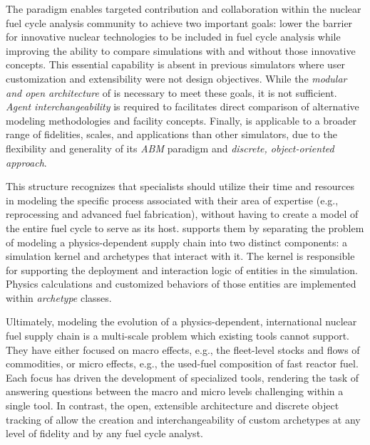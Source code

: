 The \Cyclus paradigm enables targeted contribution and collaboration within the
nuclear fuel cycle analysis community to achieve two important goals: lower the
barrier for innovative nuclear technologies to be included in fuel cycle analysis
while improving the ability to compare simulations with and without those innovative
concepts.  This essential capability is absent in
previous simulators where user customization and extensibility were not design
objectives.  While the \emph{modular and open architecture} of
\Cyclus is necessary to meet these goals, it is not sufficient.
\emph{Agent interchangeability} is required to facilitates direct comparison
of alternative modeling methodologies and facility concepts.  Finally, \Cyclus is
applicable to a broader range of fidelities, scales, and applications than
other simulators, due to the flexibility and generality of its
\emph{\gls{ABM}} paradigm and \emph{discrete, object-oriented approach}.

This structure recognizes that specialists should utilize their time and
resources in modeling the specific process associated with their area of
expertise (e.g., reprocessing and advanced fuel fabrication), without having to
create a model of the entire fuel cycle to serve as its host.  \Cyclus supports
them by separating the problem of modeling a physics-dependent supply chain into
two distinct components: a simulation kernel and archetypes that interact with
it. The kernel is responsible for supporting the deployment and
interaction logic of entities in the simulation.  Physics calculations and
customized behaviors of those entities are implemented within \emph{archetype}
classes.

Ultimately, modeling the evolution of a physics-dependent, international
nuclear fuel supply chain is a multi-scale problem which existing tools cannot
support. They have either focused on macro effects, e.g., the fleet-level
stocks and flows of commodities, or micro effects, e.g., the used-fuel
composition of fast reactor fuel. Each focus has driven the development of
specialized tools, rendering the task of answering questions between the macro
and micro levels challenging within a single tool.  In contrast, the open, extensible
architecture and discrete object tracking of \Cyclus allow the creation and
interchangeability of custom archetypes at any level of fidelity and by any
fuel cycle analyst.



